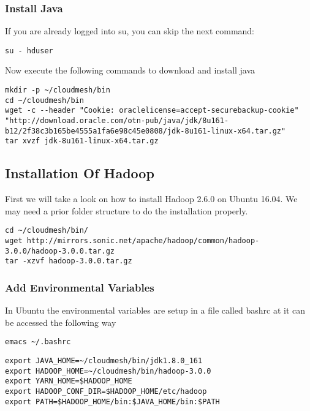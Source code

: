 \subsubsection{Install Java}

If you are already logged into su, you can skip the next command:

\begin{lstlisting}
su - hduser
\end{lstlisting}

Now execute the following commands to download and install java

\begin{lstlisting}
mkdir -p ~/cloudmesh/bin
cd ~/cloudmesh/bin
wget -c --header "Cookie: oraclelicense=accept-securebackup-cookie" "http://download.oracle.com/otn-pub/java/jdk/8u161-b12/2f38c3b165be4555a1fa6e98c45e0808/jdk-8u161-linux-x64.tar.gz"
tar xvzf jdk-8u161-linux-x64.tar.gz
\end{lstlisting}

\subsection{Installation Of Hadoop}\label{installation-of-hadoop}

First we will take a look on how to install Hadoop 2.6.0 on Ubuntu
16.04. We may need a prior folder structure to do the installation
properly.

\begin{lstlisting}
cd ~/cloudmesh/bin/
wget http://mirrors.sonic.net/apache/hadoop/common/hadoop-3.0.0/hadoop-3.0.0.tar.gz
tar -xzvf hadoop-3.0.0.tar.gz
\end{lstlisting}

\subsubsection{Add Environmental
Variables}\label{add-environmental-variables}

In Ubuntu the environmental variables are setup in a file called bashrc
at it can be accessed the following way

\begin{lstlisting}
emacs ~/.bashrc
\end{lstlisting}

\begin{lstlisting}
export JAVA_HOME=~/cloudmesh/bin/jdk1.8.0_161
export HADOOP_HOME=~/cloudmesh/bin/hadoop-3.0.0
export YARN_HOME=$HADOOP_HOME
export HADOOP_CONF_DIR=$HADOOP_HOME/etc/hadoop
export PATH=$HADOOP_HOME/bin:$JAVA_HOME/bin:$PATH
\end{lstlisting}

